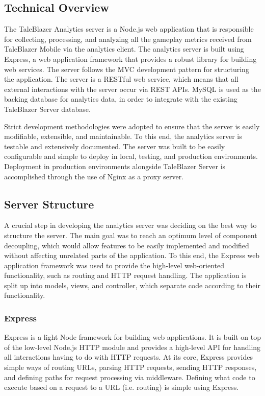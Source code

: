 \subsection{Technical Overview}

The TaleBlazer Analytics server is a Node.js web application that is responsible for collecting, processing, and analyzing all the gameplay metrics received from TaleBlazer Mobile via the analytics client. The analytics server is built using Express, a web application framework that provides a robust library for building web services. The server follows the MVC development pattern for structuring the application. The server is a RESTful web service, which means that all external interactions with the server occur via REST APIs. MySQL is used as the backing database for analytics data, in order to integrate with the existing TaleBlazer Server database.

Strict development methodologies were adopted to ensure that the server is easily modifiable, extensible, and maintainable. To this end, the analytics server is testable and extensively documented. The server was built to be easily configurable and simple to deploy in local, testing, and production environments. Deployment in production environments alongside TaleBlazer Server is accomplished through the use of Nginx as a proxy server.

\subsection{Server Structure}

A crucial step in developing the analytics server was deciding on the best way to structure the server. The main goal was to reach an optimum level of component decoupling, which would allow features to be easily implemented and modified without affecting unrelated parts of the application. To this end, the Express web application framework was used to provide the high-level web-oriented functionality, such as routing and HTTP request handling. The application is split up into models, views, and controller, which separate code according to their functionality. 

\subsubsection{Express}
Express is a light Node framework for building web applications. It is built on top of the low-level Node.js HTTP module and provides a high-level API for handling all interactions having to do with HTTP requests. At its core, Express provides simple ways of routing URLs, parsing HTTP requests, sending HTTP responses, and defining paths for request processing via middleware. Defining what code to execute based on a request to a URL (i.e. routing) is simple using Express.

